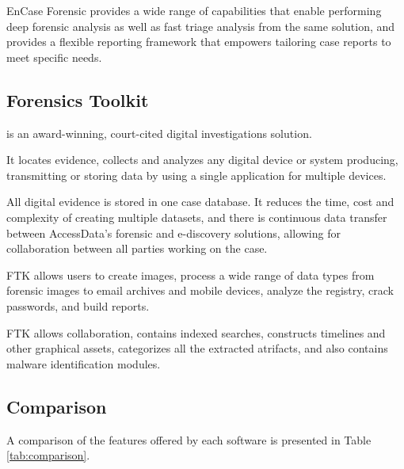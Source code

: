 EnCase Forensic provides a wide range of capabilities that enable performing deep forensic analysis as well as fast triage analysis from the same solution, and provides a flexible
reporting framework that empowers tailoring case reports to meet specific needs.

\subsection{Forensics Toolkit}

 \cite{ftk} is an award-winning, court-cited digital investigations solution. 

It locates evidence, collects and analyzes any digital device or system producing, transmitting or 
storing data by using a single application for multiple devices.

All digital evidence is stored in one case database. It reduces the time, cost and complexity of creating multiple datasets, and there is continuous data transfer between AccessData's forensic 
and e-discovery solutions, allowing for collaboration between all parties working on the case. 

FTK allows users to create images, process a wide range of data types from forensic images to email archives and 
mobile devices, analyze the registry, crack passwords, and build reports. 

FTK allows collaboration, contains indexed searches, constructs timelines and other graphical assets, categorizes all the extracted atrifacts, and also contains malware identification modules.

\subsection{Comparison}

A comparison of the features offered by each software is presented in Table \ref{tab:comparison}.

